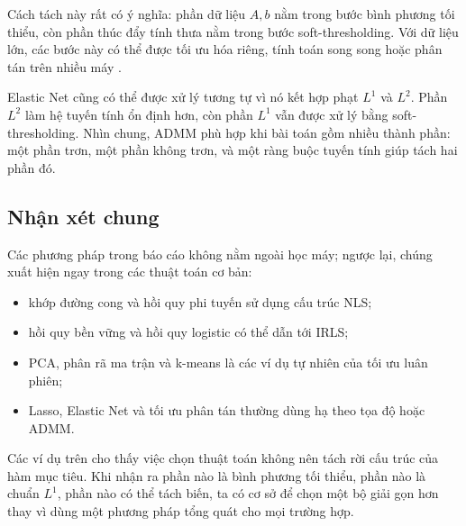 Cách tách này rất có ý nghĩa: phần dữ liệu $A,b$ nằm trong bước bình phương tối thiểu, còn phần thúc đẩy tính thưa nằm trong bước soft-thresholding. Với dữ liệu lớn, các bước này có thể được tối ưu hóa riêng, tính toán song song hoặc phân tán trên nhiều máy \cite{Boyd2011ADMM}.
\medskip

Elastic Net cũng có thể được xử lý tương tự vì nó kết hợp phạt $L^1$ và $L^2$. Phần $L^2$ làm hệ tuyến tính ổn định hơn, còn phần $L^1$ vẫn được xử lý bằng soft-thresholding. Nhìn chung, ADMM phù hợp khi bài toán gồm nhiều thành phần: một phần trơn, một phần không trơn, và một ràng buộc tuyến tính giúp tách hai phần đó.

\subsection{Nhận xét chung}
\label{SUB_SEC_ml_nhan_xet_chung}
Các phương pháp trong báo cáo không nằm ngoài học máy; ngược lại, chúng xuất hiện ngay trong các thuật toán cơ bản:
\begin{itemize}
    \item khớp đường cong và hồi quy phi tuyến sử dụng cấu trúc NLS;
    \item hồi quy bền vững và hồi quy logistic có thể dẫn tới IRLS;
    \item PCA, phân rã ma trận và k-means là các ví dụ tự nhiên của tối ưu luân phiên;
    \item Lasso, Elastic Net và tối ưu phân tán thường dùng hạ theo tọa độ hoặc ADMM.
\end{itemize}
\medskip

Các ví dụ trên cho thấy việc chọn thuật toán không nên tách rời cấu trúc của hàm mục tiêu. Khi nhận ra phần nào là bình phương tối thiểu, phần nào là chuẩn $L^1$, phần nào có thể tách biến, ta có cơ sở để chọn một bộ giải gọn hơn thay vì dùng một phương pháp tổng quát cho mọi trường hợp.
